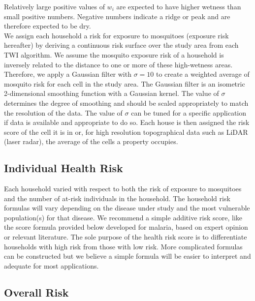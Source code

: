\documentclass{article}\usepackage[]{graphicx}\usepackage[]{color}
\begin{document}
Relatively large positive values of $w_i$ are expected to have higher wetness than small positive numbers.  Negative numbers indicate a ridge or peak and are therefore expected to be dry.\\
 

We assign each household a risk for exposure to mosquitoes (exposure risk hereafter) by deriving a continuous risk surface over the study area from each TWI algorithm.  We assume the mosquito exposure risk of a household is inversely related to the distance to one or more of these high-wetness areas.  Therefore,  we apply a Gaussian filter with $\sigma = 10$ to create a weighted average of mosquito risk for each cell in the study area.  The Gaussian filter is an isometric 2-dimensional smoothing function with a Gaussian kernel.  The value of $\sigma$ determines the degree of smoothing and should be scaled appropriately to match the resolution of the data.  The value of $\sigma$ can be tuned for a specific application if data is available and appropriate to do so. Each house is then assigned the risk score of the cell it is in or, for high resolution topographical data such as LiDAR (laser radar), the average of the cells a property occupies.\\


\subsection{Individual Health Risk}
Each household varied with respect to both the risk of exposure to mosquitoes and the number of at-risk individuals in the household. The household risk formulas will vary depending on the disease under study and the most vulnerable population(s) for that disease.  We recommend a simple additive risk score, like the score formula provided below developed for malaria, based on expert opinion or relevant literature. The sole purpose of the health risk score is to differentiate households with high risk from those with low risk.  More complicated formulas can be constructed but we believe a simple formula will be easier to interpret and adequate for most applications.\\

\subsection{Overall Risk}
\end{document}
